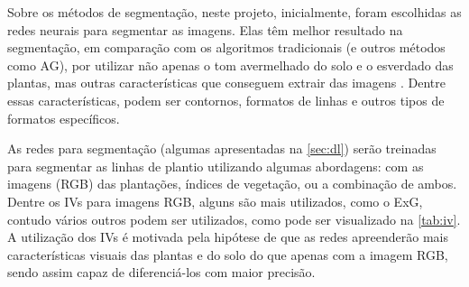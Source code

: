 \documentclass[12pt, a4paper, english, brazil]{article}
\begin{document}
Sobre os métodos de segmentação, neste projeto, inicialmente, foram escolhidas as redes neurais para segmentar as imagens. Elas têm melhor resultado na segmentação, em comparação com os algoritmos tradicionais (e outros métodos como AG), por utilizar não apenas o tom avermelhado do solo e o esverdado das plantas, mas outras características que conseguem extrair das imagens \cite{Silva_2020}. Dentre essas características, podem ser contornos, formatos de linhas e outros tipos de formatos específicos. 

As redes para segmentação (algumas apresentadas na \autoref{sec:dl}) serão treinadas para segmentar as linhas de plantio utilizando algumas abordagens: com as imagens (RGB) das plantações, índices de vegetação, ou a combinação de ambos. Dentre os IVs para imagens RGB, alguns são mais utilizados, como o ExG, contudo vários outros podem ser utilizados, como pode ser visualizado na \autoref{tab:iv}. A utilização dos IVs é motivada pela hipótese de que as redes apreenderão mais características visuais das plantas e do solo do que apenas com a imagem RGB, sendo assim capaz de diferenciá-los com maior precisão.
\end{document}

